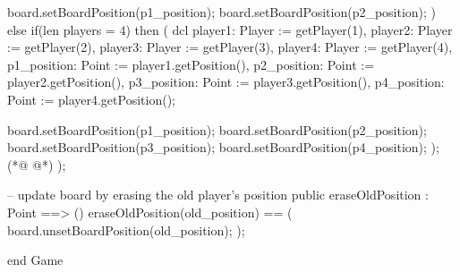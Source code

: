 \begin{vdmpp}[breaklines=true]
    board.setBoardPosition(p1_position);
    board.setBoardPosition(p2_position);
   )
   else if(len players = 4)
   then (
    dcl player1: Player := getPlayer(1),
    player2: Player := getPlayer(2),
    player3: Player := getPlayer(3),
    player4: Player := getPlayer(4),
    p1_position: Point := player1.getPosition(),
    p2_position: Point := player2.getPosition(),
    p3_position: Point := player3.getPosition(),
    p4_position: Point := player4.getPosition();
    
    board.setBoardPosition(p1_position);
    board.setBoardPosition(p2_position);
    board.setBoardPosition(p3_position);
    board.setBoardPosition(p4_position);
   );
(*@
\label{eraseOldPosition:492}
@*)
  );
  
  -- update board by erasing the old player's position
  public eraseOldPosition : Point ==> ()
  eraseOldPosition(old_position) ==
  (
   board.unsetBoardPosition(old_position);
  );

end Game
\end{vdmpp}
\bigskip
